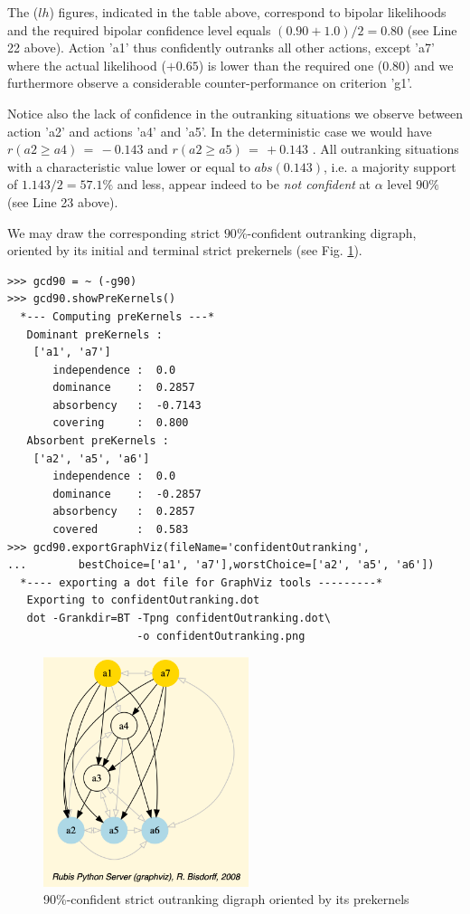 The ($lh$) figures, indicated in the table above, correspond to bipolar likelihoods and the required bipolar confidence level equals $(0.90+1.0)/2 = 0.80$ (see Line 22 above). Action 'a1' thus confidently outranks all other actions, except 'a7' where the actual likelihood ($+0.65$) is lower than the required one ($0.80$) and we furthermore observe a considerable counter-performance on criterion 'g1'.

Notice also the lack of confidence in the outranking situations we observe between action 'a2' and actions 'a4' and 'a5'. In the deterministic case we would have $r(a2 \geq a4) \,=\, -0.143$ and $r(a2 \geq a5) \,=\, +0.143$ . All outranking situations with a characteristic value lower or equal to $abs(0.143)$, i.e. a majority support of $1.143/2 = 57.1\%$ and less, appear indeed to be \emph{not confident} at $\alpha$ level $90\%$ (see Line 23 above).

We may draw the corresponding strict $90\%$-confident outranking digraph, oriented by its initial and terminal strict prekernels (see Fig. \ref{fig:18.4}).
\begin{lstlisting}
>>> gcd90 = ~ (-g90)
>>> gcd90.showPreKernels()
  *--- Computing preKernels ---*
   Dominant preKernels :
    ['a1', 'a7']
       independence :  0.0
       dominance    :  0.2857
       absorbency   :  -0.7143
       covering     :  0.800
   Absorbent preKernels :
    ['a2', 'a5', 'a6']
       independence :  0.0
       dominance    :  -0.2857
       absorbency   :  0.2857
       covered      :  0.583
>>> gcd90.exportGraphViz(fileName='confidentOutranking',
...        bestChoice=['a1', 'a7'],worstChoice=['a2', 'a5', 'a6'])
  *---- exporting a dot file for GraphViz tools ---------*
   Exporting to confidentOutranking.dot
   dot -Grankdir=BT -Tpng confidentOutranking.dot\
                    -o confidentOutranking.png
\end{lstlisting}

\begin{figure}[h]
\sidecaption
\includegraphics[width=6cm]{Figures/confidentOutranking.png}
\caption{90\%-confident strict outranking digraph oriented by its prekernels}
\label{fig:18.4}       %
\end{figure}


